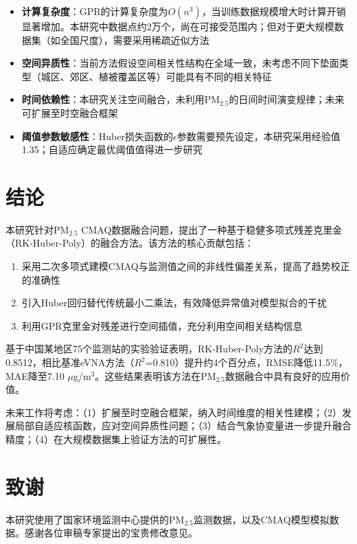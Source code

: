 \documentclass[UTF8, a4paper, 12pt]{article}
\begin{document}
\begin{itemize}
    \item \textbf{计算复杂度}：GPR的计算复杂度为$O(n^3)$，当训练数据规模增大时计算开销显著增加。本研究中数据点约2万个，尚在可接受范围内；但对于更大规模数据集（如全国尺度），需要采用稀疏近似方法
    \item \textbf{空间异质性}：当前方法假设空间相关性结构在全域一致，未考虑不同下垫面类型（城区、郊区、植被覆盖区等）可能具有不同的相关特征
    \item \textbf{时间依赖性}：本研究关注空间融合，未利用PM$_{2.5}$的日间时间演变规律；未来可扩展至时空融合框架
    \item \textbf{阈值参数敏感性}：Huber损失函数的$\epsilon$参数需要预先设定，本研究采用经验值1.35；自适应确定最优阈值值得进一步研究
\end{itemize}

\section{结论}

本研究针对PM$_{2.5}$ CMAQ数据融合问题，提出了一种基于稳健多项式残差克里金（RK-Huber-Poly）的融合方法。该方法的核心贡献包括：

\begin{enumerate}
    \item 采用二次多项式建模CMAQ与监测值之间的非线性偏差关系，提高了趋势校正的准确性
    \item 引入Huber回归替代传统最小二乘法，有效降低异常值对模型拟合的干扰
    \item 利用GPR克里金对残差进行空间插值，充分利用空间相关结构信息
\end{enumerate}

基于中国某地区75个监测站的实验验证表明，RK-Huber-Poly方法的$R^2$达到0.8512，相比基准eVNA方法（$R^2$=0.810）提升约4个百分点，RMSE降低11.5\%，MAE降至7.10 $\mu$g/m$^3$。这些结果表明该方法在PM$_{2.5}$数据融合中具有良好的应用价值。

未来工作将考虑：（1）扩展至时空融合框架，纳入时间维度的相关性建模；（2）发展局部自适应核函数，应对空间异质性问题；（3）结合气象协变量进一步提升融合精度；（4）在大规模数据集上验证方法的可扩展性。

\section*{致谢}

本研究使用了国家环境监测中心提供的PM$_{2.5}$监测数据，以及CMAQ模型模拟数据。感谢各位审稿专家提出的宝贵修改意见。



\end{document}
